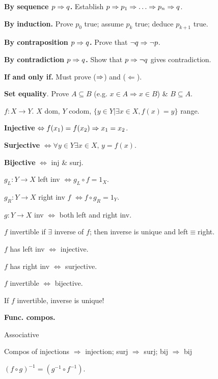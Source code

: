 
\textbf{By sequence $p\Rightarrow q$.} Establish $p\Rightarrow p_1\Rightarrow \ldots\Rightarrow p_n\Rightarrow q$.

\textbf{By induction.} Prove $p_0$ true; assume $p_k$ true; deduce $p_{k+1}$ true.

\textbf{By contraposition $p\Rightarrow q$.} Prove that $\neg q\Rightarrow \neg p$.

\textbf{By contradiction $p\Rightarrow q$.} Show that $p\Rightarrow\neg q$ gives contradiction.

\textbf{If and only if.} Must prove ($\Rightarrow$) and ($\Leftarrow$).

\textbf{Set equality}. Prove $A\subseteq B$ (e.g. $x\in A\Rightarrow x\in B$) \& $B\subseteq A$.

\begin{Definition}
$f:X\to Y$. $X$ dom, $Y$ codom, $\{y\in Y|\exists x\in X, f(x)=y\}$ range.
\begin{enumerate*}[label=\protect\circled{\arabic*}]
  \item \textbf{Injective} $\Leftrightarrow f(x_1)=f(x_2)\Rightarrow x_1=x_2$.
  \item \textbf{Surjective} $\Leftrightarrow \forall y\in Y\exists x\in X\text{, }y=f(x)$.
  \item \textbf{Bijective} $\Leftrightarrow$ inj \& surj.
\end{enumerate*}
\end{Definition}

\begin{Definition}
\begin{enumerate*}[label=\protect\circled{\arabic*}]
  \item $g_L:Y\to X$ left inv $\Leftrightarrow g_L\circ f=1_X$.
  \item $g_R:Y\to X$ right inv $f$ $\Leftrightarrow f\circ g_R=1_Y$.
  \item $g:Y\to X$ inv $\Leftrightarrow$ both left and right inv.
\end{enumerate*}
$f$ invertible if $\exists$ inverse of $f$; then inverse is unique and left$\equiv$right.
\end{Definition}

\begin{Theorem}
\begin{enumerate*}[label=\protect\circled{\arabic*}]
  \item $f$ has left inv $\Leftrightarrow$ injective.
  \item $f$ has right inv $\Leftrightarrow$ surjective.
  \item $f$ invertible $\Leftrightarrow$ bijective.
  \item If $f$ invertible, inverse is unique!
\end{enumerate*}
\end{Theorem}

\begin{Fact}
\begin{flushleft}
\textbf{Func. compos.}
\begin{enumerate*}
\item Associative
\item Compos of injections $\Rightarrow$ injection; surj $\Rightarrow$ surj; bij $\Rightarrow$ bij
\item $(f\circ g)^{-1}=(g^{-1}\circ f^{-1})$.
\end{enumerate*}
\end{flushleft}
\end{Fact}